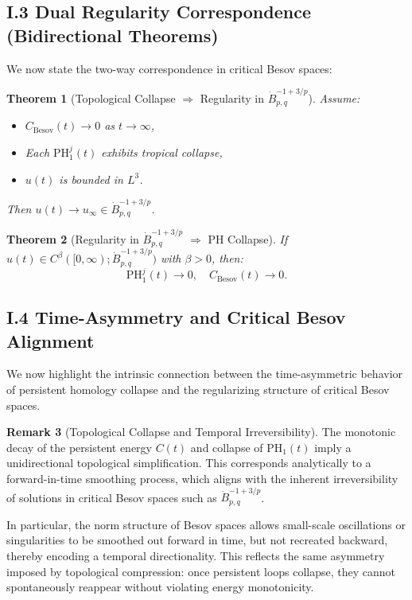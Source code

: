 \documentclass[11pt]{article}
\newtheorem{theorem}{Theorem}[section]
\theoremstyle{definition}
\newtheorem{remark}[theorem]{Remark}
\begin{document}
\subsection*{I.3 Dual Regularity Correspondence (Bidirectional Theorems)}
We now state the two-way correspondence in critical Besov spaces:

\begin{theorem}[Topological Collapse $\Rightarrow$ Regularity in $\dot{B}^{-1+3/p}_{p,q}$]
Assume:
\begin{itemize}
  \item $C_{\mathrm{Besov}}(t) \to 0$ as $t \to \infty$,
  \item Each $\mathrm{PH}^j_1(t)$ exhibits tropical collapse,
  \item $u(t)$ is bounded in $L^3$.
\end{itemize}
Then $u(t) \to u_\infty \in \dot{B}^{-1+3/p}_{p,q}$.
\end{theorem}

\begin{theorem}[Regularity in $\dot{B}^{-1+3/p}_{p,q}$ $\Rightarrow$ PH Collapse]
If $u(t) \in C^\beta([0,\infty); \dot{B}^{-1+3/p}_{p,q})$ with $\beta > 0$, then:
\[
\mathrm{PH}^j_1(t) \to 0, \quad C_{\mathrm{Besov}}(t) \to 0.
\]
\end{theorem}

\subsection*{I.4 Time-Asymmetry and Critical Besov Alignment}

We now highlight the intrinsic connection between the time-asymmetric behavior of persistent homology collapse and the regularizing structure of critical Besov spaces.

\begin{remark}[Topological Collapse and Temporal Irreversibility]
The monotonic decay of the persistent energy $C(t)$ and collapse of $\mathrm{PH}_1(t)$ imply a unidirectional topological simplification. This corresponds analytically to a forward-in-time smoothing process, which aligns with the inherent irreversibility of solutions in critical Besov spaces such as $\dot{B}^{-1+3/p}_{p,q}$.

In particular, the norm structure of Besov spaces allows small-scale oscillations or singularities to be smoothed out forward in time, but not recreated backward, thereby encoding a temporal directionality. This reflects the same asymmetry imposed by topological compression: once persistent loops collapse, they cannot spontaneously reappear without violating energy monotonicity.
\end{remark}
\end{document}
